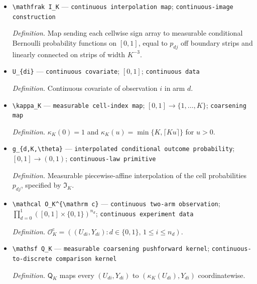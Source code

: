 \documentclass{article}
\begin{document}
\begin{itemize}
  \par\smallskip\noindent\emph{Definition.} \(\ell_T(u)=\min\{u^2,T\}\).
  \item \texttt{\textbackslash{}\allowbreak{}mathfrak I\_\allowbreak{}K} --- \texttt{continuous interpolation map}; \texttt{continuous-\allowbreak{}image construction}
  \par\smallskip\noindent\emph{Definition.} Map sending each cellwise sign array to measurable conditional Bernoulli probability functions on \([0,1]\), equal to \(p_{dj}\) off boundary strips and linearly connected on strips of width \(K^{-3}\).
  \item \texttt{U\_\allowbreak{}\{di\}\allowbreak{}} --- \texttt{continuous covariate}; \([0,1]\); \texttt{continuous data}
  \par\smallskip\noindent\emph{Definition.} Continuous covariate of observation \(i\) in arm \(d\).
  \item \texttt{\textbackslash{}\allowbreak{}kappa\_\allowbreak{}K} --- \texttt{measurable cell-\allowbreak{}index map}; \([0,1]\to\{1,\ldots,K\}\); \texttt{coarsening map}
  \par\smallskip\noindent\emph{Definition.} \(\kappa_K(0)=1\) and \(\kappa_K(u)=\min\{K,\lceil Ku\rceil\}\) for \(u>0\).
  \item \texttt{g\_\allowbreak{}\{d,\allowbreak{}K,\allowbreak{}\textbackslash{}\allowbreak{}theta\}\allowbreak{}} --- \texttt{interpolated conditional outcome probability}; \([0,1]\to(0,1)\); \texttt{continuous-\allowbreak{}law primitive}
  \par\smallskip\noindent\emph{Definition.} Measurable piecewise-affine interpolation of the cell probabilities \(p_{dj}\), specified by \(\mathfrak I_K\).
  \item \texttt{\textbackslash{}\allowbreak{}mathcal O\_\allowbreak{}K\textasciicircum{}\{\textbackslash{}\allowbreak{}mathrm c\}\allowbreak{}} --- \texttt{continuous two-\allowbreak{}arm observation}; \(\prod_{d=0}^{1}([0,1]\times\{0,1\})^{n_d}\); \texttt{continuous experiment data}
  \par\smallskip\noindent\emph{Definition.} \(\mathcal O_K^{\mathrm c}=((U_{di},Y_{di}):d\in\{0,1\},\,1\le i\le n_d)\).
  \item \texttt{\textbackslash{}\allowbreak{}mathsf Q\_\allowbreak{}K} --- \texttt{measurable coarsening pushforward kernel}; \texttt{continuous-\allowbreak{}to-\allowbreak{}discrete comparison kernel}
  \par\smallskip\noindent\emph{Definition.} \(\mathsf Q_K\) maps every \((U_{di},Y_{di})\) to \((\kappa_K(U_{di}),Y_{di})\) coordinatewise.

\end{itemize}
\end{document}
